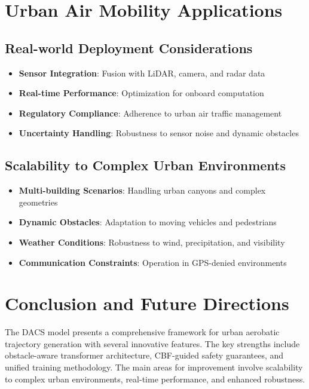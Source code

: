 \documentclass[12pt]{article}
\begin{document}
\section{Urban Air Mobility Applications}

\subsection{Real-world Deployment Considerations}

\begin{itemize}
    \item \textbf{Sensor Integration}: Fusion with LiDAR, camera, and radar data
    \item \textbf{Real-time Performance}: Optimization for onboard computation
    \item \textbf{Regulatory Compliance}: Adherence to urban air traffic management
    \item \textbf{Uncertainty Handling}: Robustness to sensor noise and dynamic obstacles
\end{itemize}

\subsection{Scalability to Complex Urban Environments}

\begin{itemize}
    \item \textbf{Multi-building Scenarios}: Handling urban canyons and complex geometries
    \item \textbf{Dynamic Obstacles}: Adaptation to moving vehicles and pedestrians
    \item \textbf{Weather Conditions}: Robustness to wind, precipitation, and visibility
    \item \textbf{Communication Constraints}: Operation in GPS-denied environments
\end{itemize}

\section{Conclusion and Future Directions}

The DACS model presents a comprehensive framework for urban aerobatic trajectory generation with several innovative features. The key strengths include obstacle-aware transformer architecture, CBF-guided safety guarantees, and unified training methodology. The main areas for improvement involve scalability to complex urban environments, real-time performance, and enhanced robustness.
\end{document}
